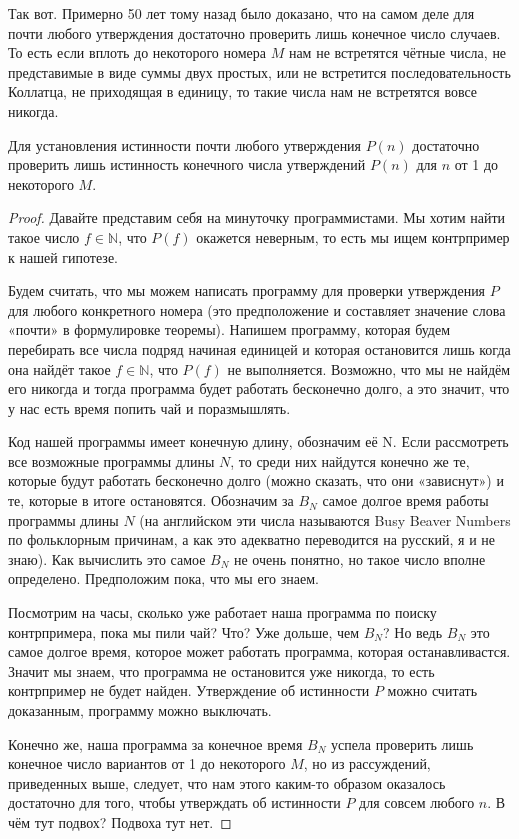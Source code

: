 Так вот. Примерно 50 лет тому назад было доказано, что на самом деле для почти любого утверждения достаточно проверить лишь конечное число случаев. То есть если вплоть до некоторого номера $M$ нам не встретятся чётные числа, не представимые в виде суммы двух простых, или не встретится последовательность Коллатца, не приходящая в единицу, то такие числа нам не встретятся вовсе никогда.

\begin{thm}
Для установления истинности почти любого утверждения $P(n)$ достаточно проверить лишь истинность конечного числа утверждений $P(n)$ для $n$ от 1 до некоторого $M$.
\end{thm}
\begin{proof}
Давайте представим себя на минуточку программистами. Мы хотим найти такое число $f\in\mathbb{N}$, что $P(f)$ окажется неверным, то есть мы ищем контрпример к нашей гипотезе.

Будем считать, что мы можем написать программу для проверки утверждения $P$ для любого конкретного номера (это предположение и составляет значение слова «почти» в формулировке теоремы). Напишем программу, которая будем перебирать все числа подряд начиная единицей и которая остановится лишь когда она найдёт такое $f\in\mathbb{N}$, что $P(f)$ не выполняется. Возможно, что мы не найдём его никогда и тогда программа будет работать бесконечно долго, а это значит, что у нас есть время попить чай и поразмышлять.

Код нашей программы имеет конечную длину, обозначим её N. Если рассмотреть все возможные программы длины $N$, то среди них найдутся конечно же те, которые будут работать бесконечно долго (можно сказать, что они «зависнут») и те, которые в итоге остановятся. Обозначим за $B_N$ самое долгое время работы программы длины $N$ (на английском эти числа называются Busy Beaver Numbers по фольклорным причинам, а как это адекватно переводится на русский, я и не знаю). Как вычислить это самое $B_N$ не очень понятно, но такое число вполне определено. Предположим пока, что мы его знаем.

Посмотрим на часы, сколько уже работает наша программа по поиску контрпримера, пока мы пили чай? Что? Уже дольше, чем $B_N$? Но ведь $B_N$ это самое долгое время, которое может работать программа, которая останавливастся. Значит мы знаем, что программа не остановится уже никогда, то есть контрпример не будет найден. Утверждение об истинности $P$ можно считать доказанным, программу можно выключать.

Конечно же, наша программа за конечное время $B_N$ успела проверить лишь конечное число вариантов от 1 до некоторого $M$, но из рассуждений, приведенных выше, следует, что нам этого каким-то образом оказалось достаточно для того, чтобы утверждать об истинности $P$ для совсем любого $n$. В чём тут подвох? Подвоха тут нет. 
\end{proof}

